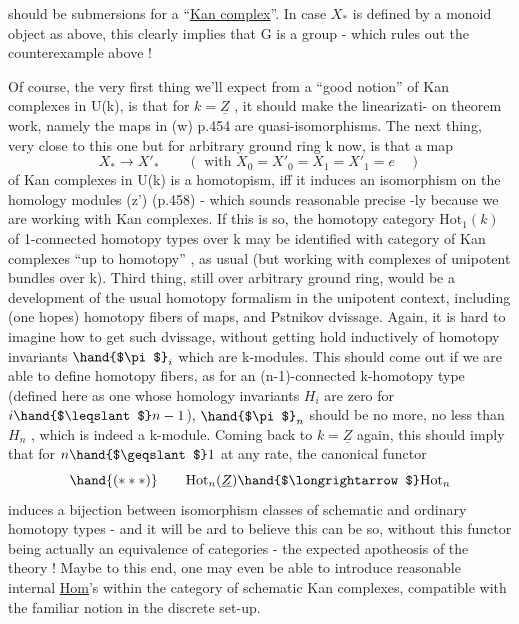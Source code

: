 
 should be submersions for a ``\uline{Kan complex}''. In case $X_*$ is
defined by a monoid object as above, this clearly implies that G is a
group  - which
rules out the counterexample above !

Of course, the very first thing we'll expect from a ``good notion'' of
Kan complexes in U(k), is that for $k=\underline{Z}$ , it should make the linearizati-%
on theorem work, namely the maps in (w) p.454 are quasi-isomorphisms.
The next thing, very close to this one but for arbitrary ground ring k
now, is that a map
\[ X_* \longrightarrow X'_* \qquad (\text{ with } X_0=X'_0=X_1=X'_1 = e \quad ) \]
of Kan complexes in U(k) is a homotopism, iff it induces an isomorphism
on the homology modules (z') (p.458) - which sounds reasonable precise
-ly because we are working with Kan complexes. If this is so, the
homotopy category $\mathrm{Hot}_1(k)$ of  1-connected homotopy types over k
may be identified with  category of Kan complexes  ``up to
homotopy'' , as usual (but working  with complexes of unipotent bundles
over k). Third thing, still over arbitrary ground ring, would be
a development of the usual homotopy formalism in the unipotent context,
including (one hopes) homotopy fibers of maps, and Pstnikov 
dvissage. Again, it is hard to imagine how to get such dvissage,
without getting hold inductively of homotopy invariants $\hand{$\pi$}_i$ which are
k-modules. This should come out if we are able to define homotopy fibers,
as for an (n-1)-connected k-homotopy type (defined here as one whose
homology invariants $H_i$ are zero for $i\hand{$\leqslant$}n-1$), $\hand{$\pi$}_n$ should be no more, no
less than $H_n$ , which is indeed a k-module. Coming back to $k=\underline{Z}$ again,
this should imply that  for $n\hand{$\geqslant$}1$ at any rate, the canonical functor
\[ \hand{(***)} \qquad \mathrm{Hot}_n(\underline{Z}) \hand{$\longrightarrow$} \mathrm{Hot}_n \]
induces a bijection between isomorphism classes of schematic and ordinary
 homotopy types - and it will be ard to believe this can be so, without
this functor being actually an equivalence of categories - the expected
apotheosis of the theory ! Maybe to this end, one may even be able to
introduce reasonable internal \uline{Hom}'s within the category of schematic
Kan complexes,   compatible with the familiar notion
in the discrete set-up.

